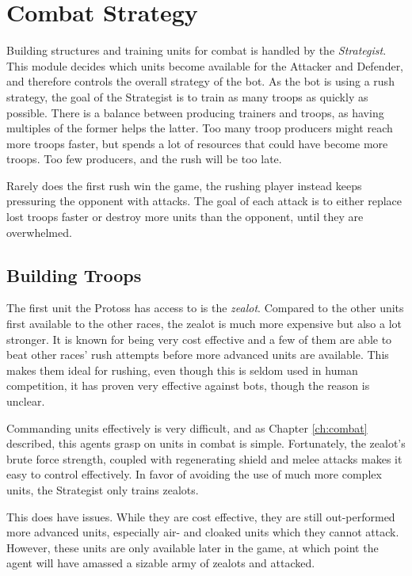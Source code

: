 \section{Combat Strategy}
Building structures and training units for combat is handled by the \emph{Strategist}. This module decides which units become available for the Attacker and Defender, and therefore controls the overall strategy of the bot. As the bot is using a rush strategy, the goal of the Strategist is to train as many troops as quickly as possible. There is a balance between producing trainers and troops, as having multiples of the former helps the latter. Too many troop producers might reach more troops faster, but spends a lot of resources that could have become more troops. Too few producers, and the rush will be too late.

Rarely does the first rush win the game, the rushing player instead keeps pressuring the opponent with attacks. The goal of each attack is to either replace lost troops faster or destroy more units than the opponent, until they are overwhelmed.

	\subsection*{Building Troops}
	The first unit the Protoss has access to is the \emph{zealot}. Compared to the other units first available to the other races, the zealot is much more expensive but also a lot stronger. It is known for being very cost effective and a few of them are able to beat other races' rush attempts before more advanced units are available. This makes them ideal for rushing, even though this is seldom used in human competition, it has proven very effective against bots, though the reason is unclear.
	
	Commanding units effectively is very difficult, and as Chapter \ref{ch:combat} described, this agents grasp on units in combat is simple. Fortunately, the zealot's brute force strength, coupled with regenerating shield and melee attacks makes it easy to control effectively. In favor of avoiding the use of much more complex units, the Strategist only trains zealots.
	
	This does have issues. While they are cost effective, they are still out-performed more advanced units, especially air- and cloaked units which they cannot attack. However, these units are only available later in the game, at which point the agent will have amassed a sizable army of zealots and attacked.
	
